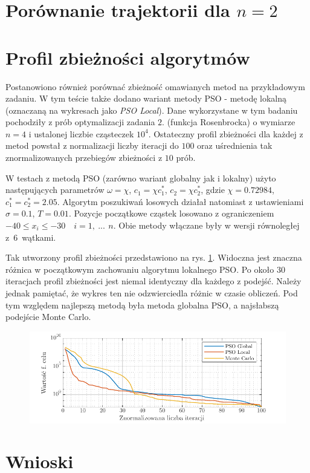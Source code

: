 \documentclass[11pt, a4paper, oneside]{article}
\begin{document}
\section{Porównanie trajektorii dla $n = 2$}

\section{Profil zbieżności algorytmów}

Postanowiono również porównać zbieżność omawianych metod na przykładowym zadaniu. W tym teście także dodano wariant metody PSO - metodę lokalną (oznaczaną na wykresach jako \textit{PSO Local}). Dane wykorzystane w tym badaniu pochodziły z prób optymalizacji zadania $2.$ (funkcja Rosenbrocka) o wymiarze $n = 4$ i ustalonej liczbie cząsteczek $10^{4}$. Ostateczny profil zbieżności dla każdej z metod powstał z normalizacji liczby iteracji do $100$ oraz uśrednienia tak znormalizowanych przebiegów zbieżności z $10$ prób.

W testach z metodą PSO (zarówno wariant globalny jak i lokalny) użyto następujących parametrów $\omega = \chi$, $c_1 = \chi c_1^*$, $c_2 = \chi c_2^*$, gdzie $\chi = 0.72984$, $c_1^* = c_2^* = 2.05$. Algorytm poszukiwań losowych działał natomiast z ustawieniami $\sigma = 0.1$, $T = 0.01$. Pozycje początkowe cząstek losowano z ograniczeniem $-40 \leq x_i \leq -30 \quad i = 1, \ ...\, \ n$. Obie metody włączane były w wersji równoległej z~$6$~wątkami.

Tak utworzony profil zbieżności przedstawiono na rys. \ref{fig:zbieznosc}. Widoczna jest znaczna różnica w początkowym zachowaniu algorytmu lokalnego PSO. Po około $30$ iteracjach profil zbieżności jest niemal identyczny dla każdego z podejść. Należy jednak pamiętać, że wykres ten nie odzwierciedla różnic w czasie obliczeń. Pod tym względem najlepszą metodą była metoda globalna PSO, a najsłabszą podejście Monte Carlo.

\begin{figure}[h]
\centerline{\includegraphics[width=\dimexpr.9\textwidth-1em]{grafiki/zbieznosc_porownanie.pdf}}
\label{fig:zbieznosc}
\end{figure}

\section{Wnioski} 

{}

\end{document}
